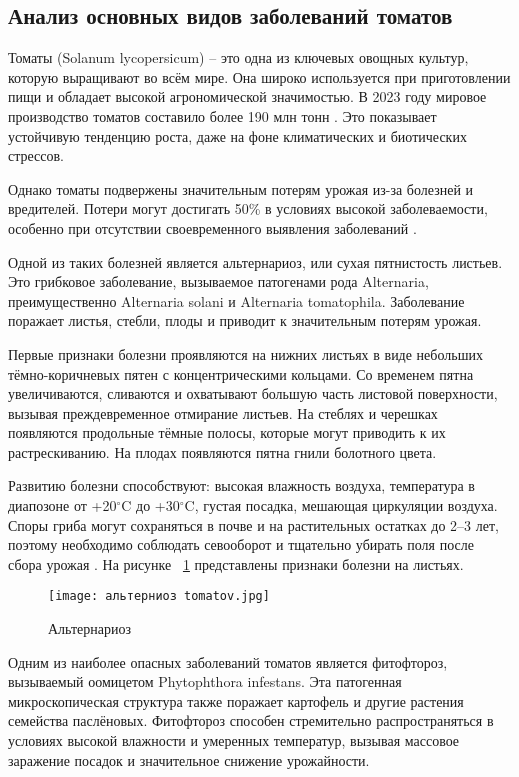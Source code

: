 \subsection{Анализ основных видов заболеваний томатов}

Томаты (Solanum lycopersicum) -- это одна из ключевых овощных культур, которую выращивают во всём мире. Она широко используется при приготовлении пищи и обладает высокой агрономической значимостью. В 2023 году мировое производство томатов составило более 190 млн тонн \cite{plant12}. Это показывает устойчивую тенденцию роста, даже на фоне климатических и биотических стрессов.

Однако томаты подвержены значительным потерям урожая из-за болезней и вредителей. Потери могут достигать 50\% в условиях высокой заболеваемости, особенно при отсутствии своевременного выявления заболеваний \cite{plant14} .

Одной из таких болезней является альтернариоз, или сухая пятнистость листьев. Это грибковое заболевание, вызываемое патогенами рода Alternaria, преимущественно Alternaria solani и Alternaria tomatophila. Заболевание поражает листья, стебли, плоды и приводит к значительным потерям урожая. 

Первые признаки болезни проявляются на нижних листьях в виде небольших тёмно-коричневых пятен с концентрическими кольцами. Со временем пятна увеличиваются, сливаются и охватывают большую часть листовой поверхности, вызывая преждевременное отмирание листьев. На стеблях и черешках появляются продольные тёмные полосы, которые могут приводить к их растрескиванию. На плодах появляются пятна гнили болотного цвета. 

Развитию болезни способствуют: высокая влажность воздуха, температура в диапозоне от +20$^{\circ}$C до +30$^{\circ}$C, густая посадка, мешающая циркуляции воздуха. Споры гриба могут сохраняться в почве и на растительных остатках до 2–3 лет, поэтому необходимо соблюдать севооборот и тщательно убирать поля после сбора урожая \cite{plant2}. На рисунке ~\ref{templ:image1} представлены признаки болезни на листьях.
\begin{figure}[h]
	\texttt{[image: альтерниоз tomatov.jpg]}
	\caption{Альтернариоз}
	\label{templ:image1}
\end{figure}

Одним из наиболее опасных заболеваний томатов является фитофтороз, вызываемый оомицетом Phytophthora infestans. Эта патогенная микроскопическая структура также поражает картофель и другие растения семейства паслёновых. Фитофтороз способен стремительно распространяться в условиях высокой влажности и умеренных температур, вызывая массовое заражение посадок и значительное снижение урожайности.

